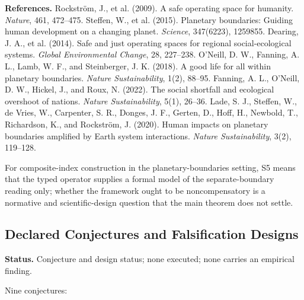 \textbf{References.} Rockström, J., et al. (2009). A safe operating space for humanity. \emph{Nature}, 461, 472--475. Steffen, W., et al. (2015). Planetary boundaries: Guiding human development on a changing planet. \emph{Science}, 347(6223), 1259855. Dearing, J. A., et al. (2014). Safe and just operating spaces for regional social-ecological systems. \emph{Global Environmental Change}, 28, 227--238. O'Neill, D. W., Fanning, A. L., Lamb, W. F., and Steinberger, J. K. (2018). A good life for all within planetary boundaries. \emph{Nature Sustainability}, 1(2), 88--95. Fanning, A. L., O'Neill, D. W., Hickel, J., and Roux, N. (2022). The social shortfall and ecological overshoot of nations. \emph{Nature Sustainability}, 5(1), 26--36. Lade, S. J., Steffen, W., de Vries, W., Carpenter, S. R., Donges, J. F., Gerten, D., Hoff, H., Newbold, T., Richardson, K., and Rockström, J. (2020). Human impacts on planetary boundaries amplified by Earth system interactions. \emph{Nature Sustainability}, 3(2), 119--128.

For composite-index construction in the planetary-boundaries setting, S5 means that the typed operator supplies a formal model of the separate-boundary reading only; whether the framework ought to be noncompensatory is a normative and scientific-design question that the main theorem does not settle.



\subsection{Declared Conjectures and Falsification Designs}

\textbf{Status.} Conjecture and design status; none executed; none carries an empirical finding.

Nine conjectures:

